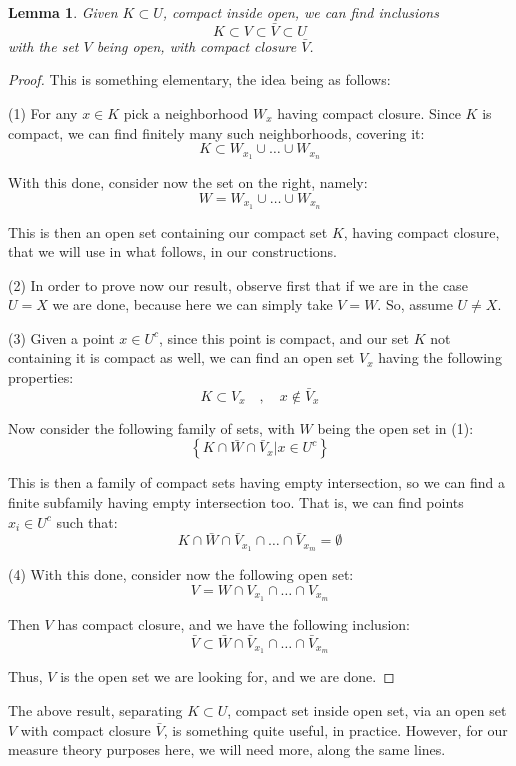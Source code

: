 \documentclass[12pt]{amsbook}
\newtheorem{lemma}[theorem]{Lemma}
\begin{document}
\begin{lemma}
Given $K\subset U$, compact inside open, we can find inclusions
$$K\subset V\subset\bar{V}\subset U$$
with the set $V$ being open, with compact closure $\bar{V}$.
\end{lemma}

\begin{proof}
This is something elementary, the idea being as follows:

\medskip

(1) For any $x\in K$ pick a neighborhood $W_x$ having compact closure. Since $K$ is compact, we can find finitely many such neighborhoods, covering it:
$$K\subset W_{x_1}\cup\ldots\cup W_{x_n}$$

With this done, consider now the set on the right, namely:
$$W=W_{x_1}\cup\ldots\cup W_{x_n}$$

This is then an open set containing our compact set $K$, having compact closure, that we will use in what follows, in our constructions.

\medskip

(2) In order to prove now our result, observe first that if we are in the case $U=X$ we are done, because here we can simply take $V=W$. So, assume $U\neq X$. 

\medskip

(3) Given a point $x\in U^c$, since this point is compact, and our set $K$ not containing it is compact as well, we can find an open set $V_x$ having the following properties:
$$K\subset V_x\quad,\quad x\notin\bar{V}_x$$

Now consider the following family of sets, with $W$ being the open set in (1):
$$\left\{K\cap\bar{W}\cap\bar{V}_x\Big|x\in U^c\right\}$$

This is then a family of compact sets having empty intersection, so we can find a finite subfamily having empty intersection too. That is, we can find points $x_i\in U^c$ such that:
$$K\cap\bar{W}\cap\bar{V}_{x_1}\cap\ldots\cap\bar{V}_{x_m}=\emptyset$$

(4) With this done, consider now the following open set:
$$V=W\cap V_{x_1}\cap\ldots\cap V_{x_m}$$

Then $V$ has compact closure, and we have the following inclusion:
$$\bar{V}\subset\bar{W}\cap\bar{V}_{x_1}\cap\ldots\cap\bar{V}_{x_m}$$

Thus, $V$ is the open set we are looking for, and we are done.
\end{proof}

The above result, separating $K\subset U$, compact set inside open set, via an open set $V$ with compact closure $\bar{V}$, is something quite useful, in practice. However, for our measure theory purposes here, we will need more, along the same lines. 
\end{document}
